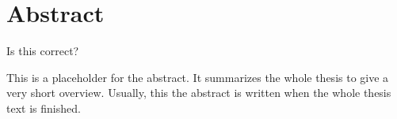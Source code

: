 \chapter*{Abstract}
\label{cha:abstract}

Is this correct?

This is a placeholder for the abstract. It summarizes the whole thesis
to give a very short overview. Usually, this the abstract is written
when the whole thesis text is finished.
